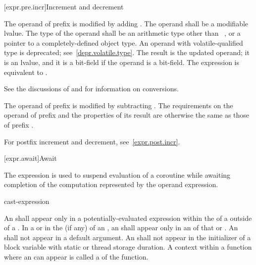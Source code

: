 [expr.pre.incr]{Increment and decrement}

\pnum
{}%
%
The operand of prefix \tcode{++}
%
%
is modified by adding .
%
The operand shall be a modifiable lvalue. The type of the operand shall
be an arithmetic type other than \cv{}~,
or a pointer to a completely-defined object type.
An operand with volatile-qualified type is deprecated;
see~\ref{depr.volatile.type}.
The result is the updated operand; it is an lvalue, and it is a
bit-field if the operand is a bit-field.
The expression  is equivalent to .
%
\begin{note}
See the discussions of  and  for information on conversions.
\end{note}

\pnum
The operand of prefix
%
\tcode{--} is modified by subtracting .
The requirements on the operand of prefix
\tcode{--} and the properties of its result are otherwise the same as
those of prefix \tcode{++}.
\begin{note}
For postfix increment and decrement, see~\ref{expr.post.incr}.
\end{note}

[expr.await]{Await}
%

\pnum
The  expression is used to suspend evaluation of a
coroutine while awaiting completion of
the computation represented by the operand expression.

\begin{bnf}
\br
     cast-expression
\end{bnf}

\pnum
An  shall appear only in a potentially-evaluated
expression within the  of a
 outside of a .
In a  or in the
 (if any)
of an , an 
shall appear only in an  of that
 or .
An  shall not appear in a
default argument.
An  shall not appear in the initializer of
a block variable with static or thread storage duration.
A context within a function where an  can appear
is called a  of the function.

